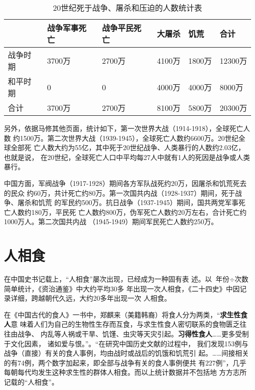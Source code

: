 \begin{table}[h] \centering
  \begin{tabular}{@{}llllll@{}}
    \toprule & 战争军事死亡 & 战争平民死亡 & 大屠杀 & 饥荒 & 合计 \\ \midrule
    战争时期 & 3700万 & 2700万 & 4100万 & 1800万 & 12300万 \\
    和平时期 & 0 & 0 & 4000万 & 4000万 & 8000万 \\
    合计 & 3700万 & 2700万 & 8100万 & 5800万 & 20300万 \\ \bottomrule
  \end{tabular}
  \caption{20世纪死于战争、屠杀和压迫的人数统计表}
  \label{20stdied}
\end{table}

另外，依据马修其他页面，统计如下，第一次世界大战（1914-1918），全球死亡人数
约1500万。第二次世界大战（1939-1945），全球死亡人数约6600万。20世纪全球全部死
亡人数大约为55亿，其中死于20世纪战争、人类暴行的人数约2.03亿，也就是说，
在20世纪，全球死亡人口中平均每27人中就有1人的死因是战争或人类暴行。

中国方面，军阀战争（1917-1928）期间各方军队战死约20万，因屠杀和饥荒死去的民众
约60万，共计死亡约80万。第一次国共内战（1928-1937）期间，死于战争、屠杀和饥荒
的军民约500万。抗日战争（1937-1945）期间，国共两党军事死亡人数约180万，平民死
亡人数约800万，伪军死亡人数约20万左右，合计死亡约1000万人。第二次国共内战
（1945-1949）期间军民死亡人数约250万。

\section{人相食}

在中国史书记载上，“人相食”屡次出现，已经成为一种固有表
述\cite{renxiangshi}。以 $ \mbox{年份} \div \mbox{次数} $ 简单统计，《资治通鉴》中大约平均30多
年出现一次人相食，《二十四史》中因记录详细，跨越朝代久远，大约20多年出现一次
人相食。

在《中国古代的食人》一书中，郑麒来（美籍韩裔）将食人分为两类，“\textbf{求生性食人}意
味着人们为自己的生物性生存而互食，与求生性食人密切联系的食物匮乏往往由战争、
内乱等人祸或干旱、饥馑、虫灾等天灾引起。\textbf{习得性食人}……更多受制于文化因素，
诸如爱与恨。”。“在研究中国历史文献的过程中，
我们发现153例与战争（直接）有关的食人事例，均由战时或战后的饥饿和饥荒引
起。……间接相关的有74例，两个数字加起来，即全部与战争有关的食人事例便共
有227例”，几乎每朝每代均发生这种求生性的群体人相食。而以上统计数据并不包括地
方方志所记载的“人相食”。

